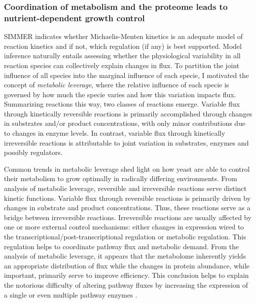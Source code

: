 \subsubsection{Coordination of metabolism and the proteome leads to nutrient-dependent growth control}

SIMMER indicates whether Michaelis-Menten kinetics is an adequate model of reaction kinetics and if not, which regulation (if any) is best supported. Model inference naturally entails assessing whether the physiological variability in all reaction species can collectively explain changes in flux. To partition the joint influence of all species into the marginal influence of each specie, I motivated the concept of \textit{metabolic leverage}, where the relative influence of each specie is governed by how much the specie varies and how this variation impacts flux. Summarizing reactions this way, two classes of reactions emerge.  Variable flux through kinetically reversible reactions is primarily accomplished through changes in substrates and/or product concentrations, with only minor contributions due to changes in enzyme levels.  In contrast, variable flux through kinetically irreversible reactions is attributable to joint variation in substrates, enzymes and possibly regulators.

Common trends in metabolic leverage shed light on how yeast are able to control their metabolism to grow optimally in radically differing environments. From analysis of metabolic leverage, reversible and irreversible reactions serve distinct kinetic functions. Variable flux through reversible reactions is primarily driven by changes in substrate and product concentrations. Thus, these reactions serve as a bridge between irreversible reactions. Irreversible reactions are usually affected by one or more external control mechanisms: either changes in expression wired to the transcriptional/post-transcriptional regulation or metabolic regulation. This regulation helps to coordinate pathway flux and metabolic demand. From the analysis of metabolic leverage, it appears that the metabolome inherently yields an appropriate distribution of flux while the changes in protein abundance, while important, primarily serve to improve efficiency. This conclusion helps to explain the notorious difficulty of altering pathway fluxes by increasing the expression of a single or even multiple pathway enzymes \cite{CornishBowden:1995fy,Schaaff:1989dl,Hauf:2000vu,Fell:1997wg}. 

